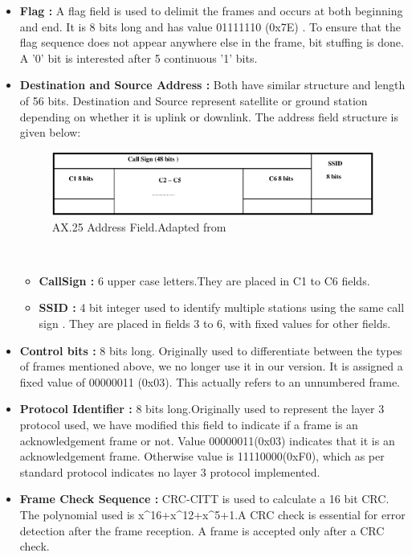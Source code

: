\documentclass[BTech]{iitmdiss}
\begin{document}
\begin{itemize}
\item \textbf{Flag : } A flag field is used to delimit the frames and occurs at both beginning and end. It is 8 bits long and has value 01111110 (0x7E) . To ensure that the flag sequence does not appear anywhere else in the frame, bit stuffing is done. A '0' bit is interested after 5 continuous '1' bits.
\item \textbf{Destination and Source Address : } Both have similar structure and length of 56 bits. Destination and Source represent satellite or ground station depending on whether it is uplink or downlink. The address field structure is given below:
\newline
\begin{figure}[H]

\includegraphics[scale = 0.65]{addressfield.eps}
\caption{AX.25 Address Field.Adapted from ~\cite{ax25}}
\label{fig:ax25addressfield}
\end{figure}

\\
\begin{itemize}

\item \textbf{CallSign : } 6 upper case letters.They are placed in C1 to C6 fields.
\item \textbf{SSID : } 4 bit integer used to identify multiple stations using the same call sign . They are placed in fields 3 to 6, with fixed values for other fields.
\end{itemize}
\item \textbf{Control bits : }8 bits long. Originally used to differentiate between the types of frames mentioned above, we no longer use it in our version. It is assigned a fixed value of 00000011 (0x03). This actually refers to an unnumbered frame. 
\item \textbf{Protocol Identifier : }8 bits long.Originally used to represent the layer 3 protocol used, we have modified this field to indicate if a frame is an acknowledgement frame or not. Value 00000011(0x03) indicates that it is an acknowledgement frame. Otherwise value is 11110000(0xF0), which as per standard protocol indicates no layer 3 protocol implemented.
\item \textbf{Frame Check Sequence : }CRC-CITT is used to calculate a 16 bit CRC. The polynomial used is x^{16}+x^{12}+x^{5}+1.A CRC check is essential for error detection after the frame reception. A frame is accepted only after a CRC check.  


\end{itemize}
\end{document}
